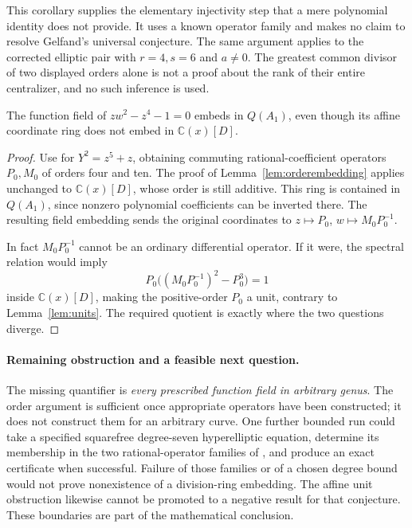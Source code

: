 This corollary supplies the elementary injectivity step that a mere polynomial identity does not provide. It uses a known operator family and makes no claim to resolve Gelfand's universal conjecture. The same argument applies to the corrected elliptic pair with \(r=4,s=6\) and \(a\ne0\). The greatest common divisor of two displayed orders alone is not a proof about the rank of their entire centralizer, and no such inference is used.

\begin{corollary}\ours\quad
The function field of \(zw^2-z^4-1=0\) embeds in \(Q(A_1)\), even though its affine coordinate ring does not embed in \(\mathbb C(x)[D]\).
\end{corollary}
\begin{proof}
Use \citet[Theorem~3(2)]{oganesyan2016rational} for \(Y^2=z^5+z\), obtaining commuting rational-coefficient operators \(P_0,M_0\) of orders four and ten. The proof of Lemma~\ref{lem:orderembedding} applies unchanged to \(\mathbb C(x)[D]\), whose order is still additive. This ring is contained in \(Q(A_1)\), since nonzero polynomial coefficients can be inverted there. The resulting field embedding sends the original coordinates to \(z\mapsto P_0\), \(w\mapsto M_0P_0^{-1}\).

In fact \(M_0P_0^{-1}\) cannot be an ordinary differential operator. If it were, the spectral relation would imply
\[
 P_0\bigl((M_0P_0^{-1})^2-P_0^3\bigr)=1
\]
inside \(\mathbb C(x)[D]\), making the positive-order \(P_0\) a unit, contrary to Lemma~\ref{lem:units}. The required quotient is exactly where the two questions diverge.
\end{proof}

\paragraph{Remaining obstruction and a feasible next question.}
The missing quantifier is \emph{every prescribed function field in arbitrary genus}. The order argument is sufficient once appropriate operators have been constructed; it does not construct them for an arbitrary curve. One further bounded run could take a specified squarefree degree-seven hyperelliptic equation, determine its membership in the two rational-operator families of \citet[Theorem~3(3)]{oganesyan2016rational}, and produce an exact certificate when successful. Failure of those families or of a chosen degree bound would not prove nonexistence of a division-ring embedding. The affine unit obstruction likewise cannot be promoted to a negative result for that conjecture. These boundaries are part of the mathematical conclusion.
